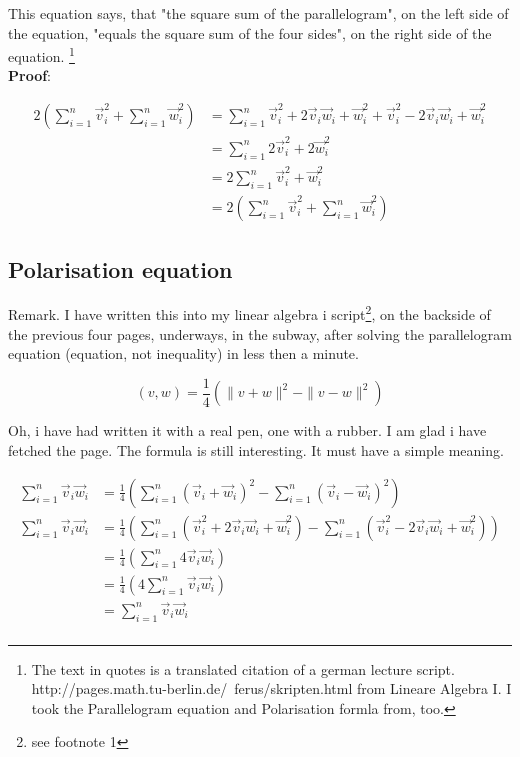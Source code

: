 \documentclass[a4paper]{article}
\begin{document}
This equation says, that "the square sum of the parallelogram", on the left side of the equation, "equals the square sum of the four sides", on the right side of the equation. \footnote{The text in quotes is a translated citation of a german lecture script. http://pages.math.tu-berlin.de/~ferus/skripten.html from Lineare Algebra I. I took the Parallelogram equation and Polarisation formla from, too.}\\

\textbf{Proof}:

\begin{displaymath}
\begin{align}
2(\sum_{i=1}^{n}\vec{v}_{i}^{2} + \sum_{i=1}^{n}\vec{w}_{i}^{2}) &= \sum_{i=1}^{n}\vec{v}_{i}^{2}+2\vec{v}_{i}\vec{w}_{i}+\vec{w}_{i}^{2}+\vec{v}_{i}^{2}-2\vec{v}_{i}\vec{w}_{i}+\vec{w}_{i}^{2}\\
&= \sum_{i=1}^{n}2\vec{v}_{i}^{2}+2\vec{w}_{i}^2\\ 
&= 2\sum_{i=1}^{n}\vec{v}_{i}^{2}+\vec{w}_{i}^{2} \\
&= 2(\sum_{i=1}^{n}\vec{v}_{i}^{2} + \sum_{i=1}^{n}\vec{w}_{i}^{2})
\end{align}
\end{displaymath}

\subsection{Polarisation equation}

Remark. I have written this into my linear algebra i script\footnote{see footnote 1}, on the backside of the previous four pages, underways, 
in the subway, after solving the parallelogram equation (equation, not inequality) in less then a minute. 

\begin{displaymath}
(v,w) = \frac{1}{4}(\|v+w\|^{2}-\|v-w\|^{2})
\end{displaymath}

Oh, i have had written it with a real pen, one with a rubber. I am glad i have fetched the page. The formula is still interesting.
It must have a simple meaning.

\begin{displaymath}
\begin{align}
\sum_{i=1}^{n}\vec{v}_{i}\vec{w}_{i} &= \frac{1}{4}(\sum_{i=1}^{n}(\vec{v}_{i}+\vec{w}_{i})^{2} - \sum_{i=1}^{n}(\vec{v}_{i}-\vec{w}_{i})^{2}) \\
\sum_{i=1}^{n}\vec{v}_{i}\vec{w}_{i} &= \frac{1}{4}(\sum_{i=1}^{n}(\vec{v}_{i}^{2}+2\vec{v}_{i}\vec{w}_{i}+\vec{w}_{i}^{2})-\sum_{i=1}^{n}(\vec{v}_{i}^{2}-2\vec{v}_{i}\vec{w}_{i}+\vec{w}_{i}^{2}))\\
&= \frac{1}{4}(\sum_{i=1}^{n}4\vec{v}_{i}\vec{w}_{i})\\
&= \frac{1}{4}(4\sum_{i=1}^{n}\vec{v}_{i}\vec{w}_{i})\\
&= \sum_{i=1}^{n}\vec{v}_{i}\vec{w}_{i}\\
\end{align}
\end{displaymath}
\end{document}
